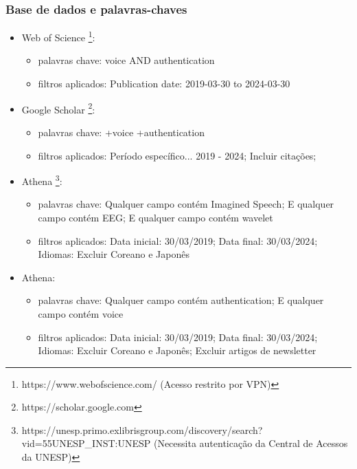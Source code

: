 			\subsubsection{Base de dados e palavras-chaves}
			\label{sec:baseEPalavras}
			\begin{itemize}
				\item Web of Science \footnote{https://www.webofscience.com/ (Acesso restrito por VPN)}:
				\begin{itemize}
					\item palavras chave: voice AND authentication
					\item filtros aplicados: Publication date: 2019-03-30 to 2024-03-30
				\end{itemize}
				
				\item Google Scholar \footnote{https://scholar.google.com}:
				\begin{itemize}
					\item palavras chave: +voice +authentication
					\item filtros aplicados: Período específico... 2019 - 2024; Incluir citações;
				\end{itemize}
				\item Athena \footnote{https://unesp.primo.exlibrisgroup.com/discovery/search?vid=55UNESP\_INST:UNESP (Necessita autenticação da Central de Acessos da UNESP)}:
				\begin{itemize}
					\item palavras chave: Qualquer campo contém Imagined Speech; E qualquer campo contém EEG; E qualquer campo contém wavelet
					\item filtros aplicados: Data inicial: 30/03/2019; Data final: 30/03/2024; Idiomas: Excluir Coreano e Japonês
				\end{itemize}
				\item Athena:
				\begin{itemize}
					\item palavras chave: Qualquer campo contém authentication; E qualquer campo contém voice
					\item filtros aplicados: Data inicial: 30/03/2019; Data final: 30/03/2024; Idiomas: Excluir Coreano e Japonês; Excluir artigos de newsletter
				\end{itemize}
			\end{itemize}
		
